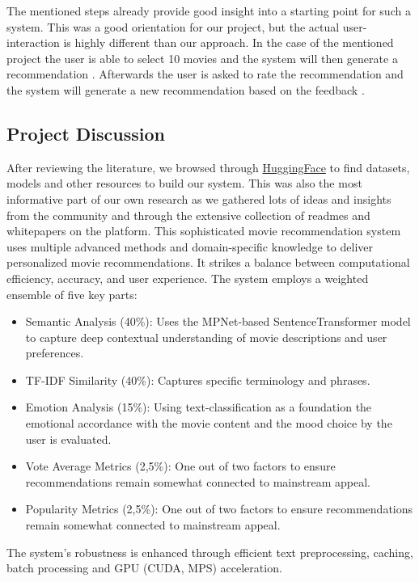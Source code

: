 \documentclass[12pt,a4paper]{article}
\begin{document}
  \noindent The mentioned steps already provide good insight into a starting point for such a system.
  This was a good orientation for our project, but the actual user-interaction is highly different than our approach.
  In the case of the mentioned project the user is able to select 10 movies and the system will then generate a recommendation \cite{Iglesias-pardo-lopez-quintero-2024}.
  Afterwards the user is asked to rate the recommendation and the system will generate a new recommendation based on the feedback \cite{Iglesias-pardo-lopez-quintero-2024}.

  \subsection{Project Discussion}

  After reviewing the literature, we browsed through \href{https://www.huggingface.com/}{HuggingFace} to find datasets,
  models and other resources to build our system.
  This was also the most informative part of our own research as we gathered lots of ideas and insights from the community
  and through the extensive collection of readmes and whitepapers on the platform.
  This sophisticated movie recommendation system uses multiple advanced methods and domain-specific knowledge
  to deliver personalized movie recommendations. It strikes a balance between computational efficiency, accuracy, and
  user experience.
  The system employs a weighted ensemble of five key parts:
  \begin{itemize}
    \item Semantic Analysis (40\%): Uses the MPNet-based SentenceTransformer model to capture deep contextual understanding of movie descriptions and user preferences.
    \item TF-IDF Similarity (40\%): Captures specific terminology and phrases.
    \item Emotion Analysis (15\%): Using text-classification as a foundation the emotional accordance with the movie content and the mood choice by the user is evaluated.
    \item Vote Average Metrics (2,5\%): One out of two factors to ensure recommendations remain somewhat connected to mainstream appeal.
    \item Popularity Metrics (2,5\%): One out of two factors to ensure recommendations remain somewhat connected to mainstream appeal.
  \end{itemize}

  \noindent The system’s robustness is enhanced through efficient text preprocessing, caching, batch processing and
  GPU (CUDA, MPS) acceleration.
\end{document}
